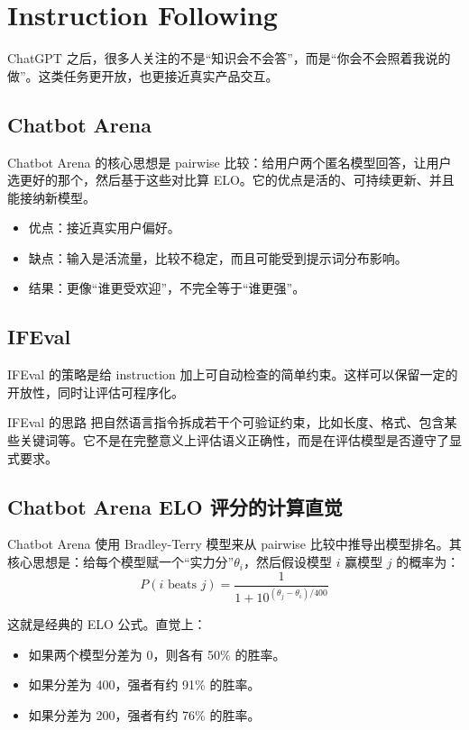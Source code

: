 \section{Instruction Following}

ChatGPT 之后，很多人关注的不是``知识会不会答''，而是``你会不会照着我说的做''。这类任务更开放，也更接近真实产品交互。

\subsection{Chatbot Arena}

Chatbot Arena 的核心思想是 pairwise 比较：给用户两个匿名模型回答，让用户选更好的那个，然后基于这些对比算 ELO。它的优点是活的、可持续更新、并且能接纳新模型。

\begin{itemize}
    \item 优点：接近真实用户偏好。
    \item 缺点：输入是活流量，比较不稳定，而且可能受到提示词分布影响。
    \item 结果：更像“谁更受欢迎”，不完全等于“谁更强”。
\end{itemize}

\subsection{IFEval}

IFEval 的策略是给 instruction 加上可自动检查的简单约束。这样可以保留一定的开放性，同时让评估可程序化。

\begin{knowledgebox}{IFEval 的思路}
把自然语言指令拆成若干个可验证约束，比如长度、格式、包含某些关键词等。它不是在完整意义上评估语义正确性，而是在评估模型是否遵守了显式要求。
\end{knowledgebox}

\subsection{Chatbot Arena ELO 评分的计算直觉}

Chatbot Arena 使用 Bradley-Terry 模型来从 pairwise 比较中推导出模型排名。其核心思想是：给每个模型赋一个``实力分''$\theta_i$，然后假设模型 $i$ 赢模型 $j$ 的概率为：
\[
P(i \text{ beats } j) = \frac{1}{1 + 10^{(\theta_j - \theta_i)/400}}
\]

这就是经典的 ELO 公式。直觉上：
\begin{itemize}
    \item 如果两个模型分差为 0，则各有 50\% 的胜率。
    \item 如果分差为 400，强者有约 91\% 的胜率。
    \item 如果分差为 200，强者有约 76\% 的胜率。
\end{itemize}

